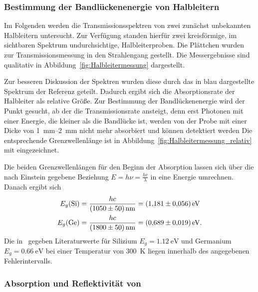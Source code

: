 \documentclass[a4paper,twoside,final]{article}
\begin{document}


\FloatBarrier
\subsubsection{Bestimmung der Bandlückenenergie von Halbleitern}

Im Folgenden werden die Transmissionsspektren von zwei zunächst unbekannten Halbleitern untersucht. Zur Verfügung standen hierfür zwei kreisförmige, im sichtbaren Spektrum undurchsichtige, Halbleiterproben. Die Plättchen wurden zur Transmissionsmessung in den Strahlengang gestellt. Die Messergebnisse sind qualitativ in Abbildung~\ref{fig:Halbleitermessung} dargestellt.



Zur besseren Diskussion der Spektren wurden diese durch das in blau dargestellte Spektrum der Referenz geteilt. Dadurch ergibt sich die Absorptionsrate der Halbleiter als relative Größe. Zur Bestimmung der Bandlückenenergie wird der Punkt gesucht, ab der die Transmissionsrate ansteigt, denn erst Photonen mit einer Energie, die kleiner als die Bandlücke ist, werden von der Probe mit einer Dicke von \SIrange{1}{2}{\milli\metre} nicht mehr absorbiert und können detektiert werden Die entsprechende Grenzwellenlänge ist in Abbildung~\ref{fig:Halbleitermessung_relativ} mit eingezeichnet.



Die beiden Grenzwellenlängen für den Beginn der Absorption lassen sich über die nach Einstein gegebene Beziehung $E = h \nu = \frac{h c}{\lambda}$ in eine Energie umrechnen. Danach ergibt sich
\begin{align}
  E_g(\ce{Si}) &= \frac{h c}{\SI{1050\pm50}{\nano\metre}} = \SI{1.181\pm0.056}{\electronvolt}\\
  E_g(\ce{Ge}) &= \frac{h c}{\SI{1800\pm50}{\nano\metre}} = \SI{0.689\pm0.019}{\electronvolt}.
\end{align}
Die in~\cite{Hunklinger} gegeben Literaturwerte für Silizium $E_g = \SI{1.12}{\electronvolt}$ und Germanium $E_g = \SI{0.66}{\electronvolt}$ bei einer Temperatur von \SI{300}{\kelvin} liegen innerhalb des angegebenen Fehlerintervalls.

\subsubsection{Absorption und Reflektivität von }
\end{document}
